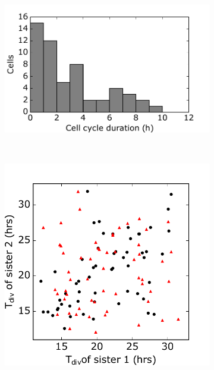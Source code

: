 \documentclass[pdftex,12pt,a4paper]{report}
\begin{document}
\begin{figure}[H]
\centering
\begin{subfigure}{.4\textwidth}
  \centering
  \includegraphics[width=\textwidth]{images/ccd_hist_unsyn.pdf}
  \caption{}
  \label{fig:ccd_hist_unsyn}
\end{subfigure}
~
\begin{subfigure}{.4\textwidth}
  \centering
  \includegraphics[width=\textwidth]{images/ccd_scatter_unsyn.pdf}
  \caption{}
  \label{fig:ccd_scatter_unsyn}
\end{subfigure}

\centering


\end{figure}
\end{document}
